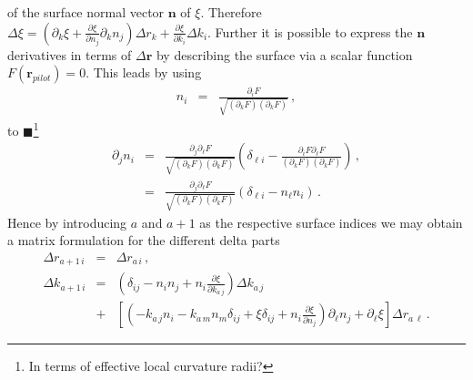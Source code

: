 \documentclass[12pt,a4paper,twoside,openright,BCOR10mm,headsepline,titlepage,abstracton,chapterprefix,final]{scrreprt}
\newcommand\Vector[1]{{\mathbf{#1}}}
\newcommand\wavenumber{k}
\newcommand{\remark}[1]{{\color{red}$\blacksquare$}\footnote{{\color{red}#1}}}
\begin{document}
of the surface normal vector $\Vector{n}$ of $\xi$. Therefore 
$\Delta \xi = \left(\partial_k \xi + \frac{\partial \xi}{\partial n_j} \partial_k n_j\right) \Delta r_k + \tfrac{\partial \xi}{\partial k_i} \Delta k_i$. 
Further it is possible to express the $\Vector{n}$ derivatives in terms of $\Delta \Vector{r}$ by describing the surface via
a scalar function $F(\Vector{r}_{pilot}) = 0$. This leads by using
\begin{eqnarray}
 n_i &=& \frac{\partial_i F}{\sqrt{(\partial_k F)(\partial_k F)}}\,,
\end{eqnarray}
to
\remark{In terms of effective local curvature radii?}
\begin{eqnarray}
  \partial_j n_i &=& \frac{\partial_j \partial_\ell F}{\sqrt{(\partial_k F)(\partial_k F)}} \left(\delta_{\ell i} - \frac{\partial_i F \partial_\ell F}{(\partial_k F)(\partial_k F)}\right)\,,\\
    &=& \frac{\partial_j \partial_\ell F}{\sqrt{(\partial_k F)(\partial_k F)}} \left(\delta_{\ell i} - n_\ell n_i\right)\,.\label{eq:nderivative}
\end{eqnarray}
Hence by introducing $a$ and $a+1$ as the respective surface indices we may obtain a matrix formulation for the different delta parts
\begin{eqnarray}
 \Delta r_{a+1\,i} &=& \Delta r_{a\,i}\,,\\
 \Delta \wavenumber_{a+1\,i} &=& 
   \left( \delta_{ij}  - n_i n_j + n_i \frac{\partial \xi}{\partial \wavenumber_{a\,j}}\right) \Delta\wavenumber_{a\,j} \nonumber\\
   &+&
   \left[
      \left(
     - \wavenumber_{a\,j}  n_i 
     - \wavenumber_{a\,m} n_m \delta_{ij}  
     + \xi \delta_{ij}
     + n_i \frac{\partial \xi}{\partial n_j}
    \right) \partial_\ell n_j + \partial_\ell \xi\right]\Delta r_{a\,\ell}\,.
\end{eqnarray}
\end{document}
